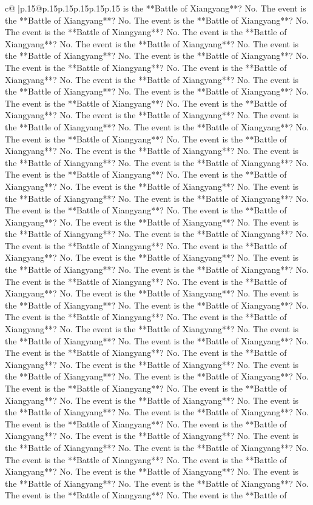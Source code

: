 \documentclass{article}
\begin{document}
{\begin{supertabular}{c@{$\;$}|p{.15\linewidth}@{}p{.15\linewidth}p{.15\linewidth}p{.15\linewidth}p{.15\linewidth}p{.15\linewidth}}
{{{is the **Battle of Xiangyang**? No. The event is the **Battle of Xiangyang**? No. The event is the **Battle of Xiangyang**? No. The event is the **Battle of Xiangyang**? No. The event is the **Battle of Xiangyang**? No. The event is the **Battle of Xiangyang**? No. The event is the **Battle of Xiangyang**? No. The event is the **Battle of Xiangyang**? No. The event is the **Battle of Xiangyang**? No. The event is the **Battle of Xiangyang**? No. The event is the **Battle of Xiangyang**? No. The event is the **Battle of Xiangyang**? No. The event is the **Battle of Xiangyang**? No. The event is the **Battle of Xiangyang**? No. The event is the **Battle of Xiangyang**? No. The event is the **Battle of Xiangyang**? No. The event is the **Battle of Xiangyang**? No. The event is the **Battle of Xiangyang**? No. The event is the **Battle of Xiangyang**? No. The event is the **Battle of Xiangyang**? No. The event is the **Battle of Xiangyang**? No. The event is the **Battle of Xiangyang**? No. The event is the **Battle of Xiangyang**? No. The event is the **Battle of Xiangyang**? No. The event is the **Battle of Xiangyang**? No. The event is the **Battle of Xiangyang**? No. The event is the **Battle of Xiangyang**? No. The event is the **Battle of Xiangyang**? No. The event is the **Battle of Xiangyang**? No. The event is the **Battle of Xiangyang**? No. The event is the **Battle of Xiangyang**? No. The event is the **Battle of Xiangyang**? No. The event is the **Battle of Xiangyang**? No. The event is the **Battle of Xiangyang**? No. The event is the **Battle of Xiangyang**? No. The event is the **Battle of Xiangyang**? No. The event is the **Battle of Xiangyang**? No. The event is the **Battle of Xiangyang**? No. The event is the **Battle of Xiangyang**? No. The event is the **Battle of Xiangyang**? No. The event is the **Battle of Xiangyang**? No. The event is the **Battle of Xiangyang**? No. The event is the **Battle of Xiangyang**? No. The event is the **Battle of Xiangyang**? No. The event is the **Battle of Xiangyang**? No. The event is the **Battle of Xiangyang**? No. The event is the **Battle of Xiangyang**? No. The event is the **Battle of Xiangyang**? No. The event is the **Battle of Xiangyang**? No. The event is the **Battle of Xiangyang**? No. The event is the **Battle of Xiangyang**? No. The event is the **Battle of Xiangyang**? No. The event is the **Battle of Xiangyang**? No. The event is the **Battle of Xiangyang**? No. The event is the **Battle of Xiangyang**? No. The event is the **Battle of Xiangyang**? No. The event is the **Battle of Xiangyang**? No. The event is the **Battle of Xiangyang**? No. The event is the **Battle of Xiangyang**? No. The event is the **Battle of Xiangyang**? No. The event is the **Battle of Xiangyang**? No. The event is the **Battle of Xiangyang**? No. The event is the **Battle of Xiangyang**? No. The event is the **Battle of Xiangyang**? No. The event is the **Battle of Xiangyang**? No. The event is the **Battle of Xiangyang**? No. The event is the **Battle of Xiangyang**? No. The event is the **Battle of Xiangyang**? No. The event is the **Battle of Xiangyang**? No. The event is the **Battle of }}}
\end{supertabular}}
\end{document}
